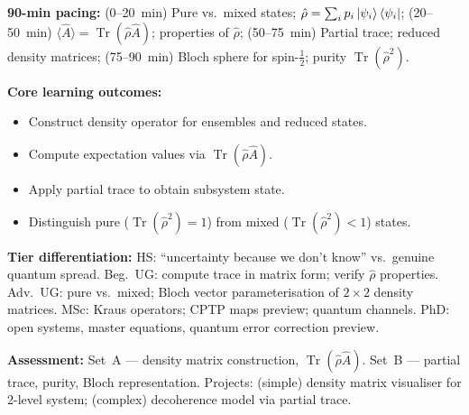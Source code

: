 \documentclass[11pt,a4paper]{article}
\begin{document}
\medskip
\begin{tcolorbox}[modulebox, title={Module~I.2 / L11: Density Operators, Mixed States \& Partial Trace}]
\textbf{90-min pacing:} (0--20~min) Pure vs.\ mixed states;
$\hat{\rho}=\sum_i p_i\ket{\psi_i}\bra{\psi_i}$;
(20--50~min) $\langle\hat{A}\rangle=\operatorname{Tr}(\hat{\rho}\hat{A})$; properties of $\hat{\rho}$;
(50--75~min) Partial trace; reduced density matrices;
(75--90~min) Bloch sphere for spin-$\tfrac{1}{2}$; purity $\operatorname{Tr}(\hat{\rho}^2)$.

\medskip\textbf{Core learning outcomes:}
\begin{itemize}[leftmargin=1.4em,topsep=2pt,itemsep=1pt]
  \item Construct density operator for ensembles and reduced states.
  \item Compute expectation values via $\operatorname{Tr}(\hat{\rho}\hat{A})$.
  \item Apply partial trace to obtain subsystem state.
  \item Distinguish pure ($\operatorname{Tr}(\hat{\rho}^2)=1$) from mixed ($\operatorname{Tr}(\hat{\rho}^2)<1$) states.
\end{itemize}

\medskip\textbf{Tier differentiation:}
HS: ``uncertainty because we don't know'' vs.\ genuine quantum spread.
Beg.\ UG: compute trace in matrix form; verify $\hat{\rho}$ properties.
Adv.\ UG: pure vs.\ mixed; Bloch vector parameterisation of $2\times 2$ density matrices.
MSc: Kraus operators; CPTP maps preview; quantum channels.
PhD: open systems, master equations, quantum error correction preview.

\medskip\textbf{Assessment:}
Set~A --- density matrix construction, $\operatorname{Tr}(\hat{\rho}\hat{A})$.
Set~B --- partial trace, purity, Bloch representation.
Projects: (simple) density matrix visualiser for 2-level system; (complex) decoherence model via partial trace.
\end{tcolorbox}
\end{document}
